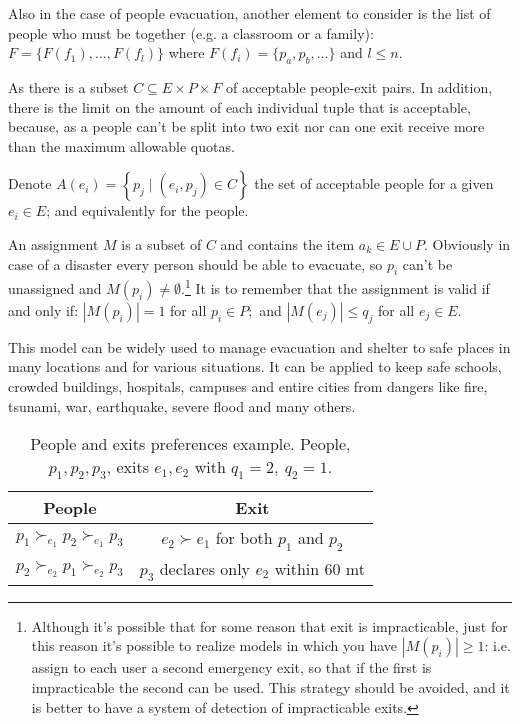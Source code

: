 Also in the case of people evacuation, another element to consider is the list of people who must be together (e.g. a classroom or a family): \(F=\{F(f_1), \dots, F(f_l)\}\) where  \(F(f_i) = \{p_a, p_b, \dots\}\) and \(l\leq n\).
    
As there is a subset \(C \subseteq E \times P \times F\) of acceptable people-exit pairs.
In addition, there is the limit on the amount of each individual tuple that is acceptable, because, as a people can't be split into two exit nor can one exit receive more than the maximum allowable quotas.

Denote \( A \left( e_i \right) = \left\{ p_j \mid \left( e_i , p_j \right) \in C \right\} \) the set of acceptable people for a given \( e_i \in E \); and equivalently for the people.

An assignment \(M\) is a subset of \(C\) and contains the item \( a_k \in E \cup P \).
Obviously in case of a disaster every person should be able to evacuate, so  \( p_i\) can't be unassigned and \( M \left( p_i\right) \neq \emptyset \).\footnote{Although it's possible that for some reason that exit is impracticable, just for this reason it's possible to realize models in which you have \(|M \left( p_i \right)| \geq 1\): i.e. assign to each user a second emergency exit, so that if the first is impracticable the second can be used.
This strategy should be avoided, and it is better to have a system of detection of impracticable exits.}
It is to remember that the assignment is valid if and only if: \( \left| M \left( p_i\right) \right| = 1 \) for all \( p_i\in P ; \) and \( \left| M \left( e_j \right) \right| \leq q _ { j } \) for all \( e_j \in E  \).

This model can be widely used to manage evacuation and shelter to safe places in many locations and for various situations.
It can be applied to keep safe schools, crowded buildings, hospitals, campuses and entire cities from dangers like fire, tsunami, war, earthquake, severe flood and many others.

\begin{table}[!htb]
    \centering
    \begin{tabular}{c|c}
        \hline People                                             & Exit                                                       \\
        \hline\( p_{1} \succ_{e_{1}} p_{2} \succ_{e_{1}} p_{3} \) & \( e_{2} \succ e_{1} \) for both \( p_{1} \) and \( p_{2} \) \\
        \( p_{2} \succ_{e_{2}} p_{1} \succ_{e_{2}} p_{3} \)       & \( p_{3} \) declares only \( e_{2} \) within 60 mt         \\
        \hline
    \end{tabular}
    \caption{People and exits preferences example. People, \(p_1, p_2, p_3\), exits \(e_1, e_2\) with \( q_1 = 2, \ q_2 = 1\).}
    \label{tab:people-exit}
\end{table}
